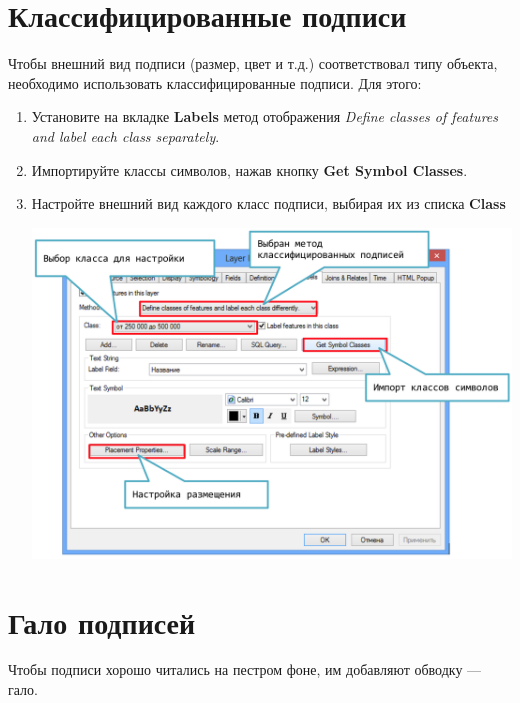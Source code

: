 \documentclass[12pt,]{book}
\begin{document}
\hypertarget{section-25}{%
\section{Классифицированные подписи}\label{section-25}}

Чтобы внешний вид подписи (размер, цвет и т.д.) соответствовал типу объекта, необходимо использовать классифицированные подписи. Для этого:

\begin{enumerate}
\def\labelenumi{\arabic{enumi}.}
\item
  Установите на вкладке \textbf{Labels} метод отображения \emph{Define classes of features and label each class separately}.
\item
  Импортируйте классы символов, нажав кнопку \textbf{Get Symbol Classes}.
\item
  Настройте внешний вид каждого класс подписи, выбирая их из списка \textbf{Class}

  \includegraphics{images/Appendix/image41.png}
\end{enumerate}

\hypertarget{section-26}{%
\section{Гало подписей}\label{section-26}}

Чтобы подписи хорошо читались на пестром фоне, им добавляют обводку --- гало.
\end{document}

